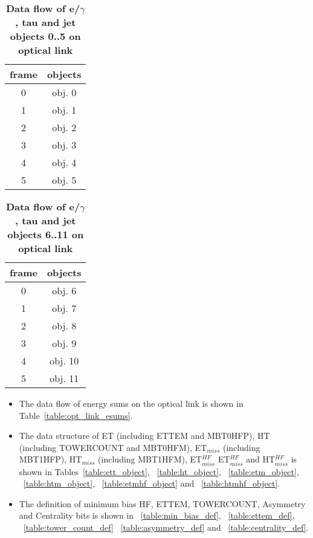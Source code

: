 \documentclass{cmspaper}
\begin{document}
\begin{table}[ht]
\caption{\bf Data flow of e/$\gamma$, tau and jet objects 0..5 on optical link}
\vspace{5mm}
\centering
\begin{tabular}{|c|c|}\hline
frame & objects\\\hline\hline
0 & obj. 0 \\\hline
1 & obj. 1 \\\hline
2 & obj. 2 \\\hline
3 & obj. 3 \\\hline
4 & obj. 4 \\\hline
5 & obj. 5 \\\hline
\end{tabular}
\label{table:opt_link_egamma_obj_0_5}
\end{table}

\begin{table}[ht]
\caption{\bf Data flow of e/$\gamma$, tau and jet objects 6..11 on optical link}
\vspace{5mm}
\centering
\begin{tabular}{|c|c|}\hline
frame & objects\\\hline\hline
0 & obj. 6 \\\hline
1 & obj. 7 \\\hline
2 & obj. 8 \\\hline
3 & obj. 9 \\\hline
4 & obj. 10 \\\hline
5 & obj. 11 \\\hline
\end{tabular}
\label{table:opt_link_egamma_obj_6_11}
\end{table}

\clearpage

\begin{itemize}
\item The data flow of energy sums on the optical link is shown in Table~\ref{table:opt_link_esums}.
\item The data structure of ET (including ETTEM and MBT0HFP), HT (including TOWERCOUNT and MBT0HFM), ET$_{miss}$ (including MBT1HFP), HT$_{miss}$ (including MBT1HFM), ET$_{miss}^{HF}$    ET$_{miss}^{HF}$
and HT$_{miss}^{HF}$
is shown in Tables~\ref{table:ett_object}, ~\ref{table:ht_object}, ~\ref{table:etm_object}, ~\ref{table:htm_object}, ~\ref{table:etmhf_object} and ~\ref{table:htmhf_object}.
\item The definition of minimum bias HF, ETTEM, TOWERCOUNT, Asymmetry and Centrality bits is shown in ~\ref{table:min_bias_def}, ~\ref{table:ettem_def}, ~\ref{table:tower_count_def}
~\ref{table:asymmetry_def} and ~\ref{table:centrality_def}.
\end{itemize}
\end{document}
